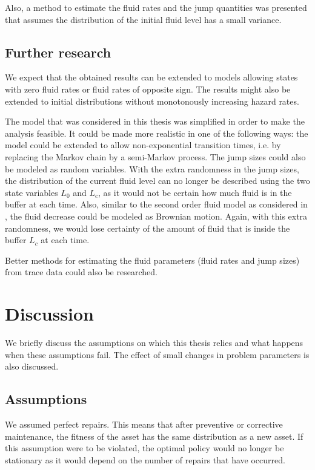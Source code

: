 \documentclass[a4paper]{thesis}
\theoremstyle{definition}
\begin{document}
Also, a method to estimate the fluid rates and the jump quantities was presented that assumes the distribution of the initial fluid level has a small variance.

\section{Further research}
We expect that the obtained results can be extended to models allowing states with zero fluid rates or fluid rates of opposite sign.
The results might also be extended to initial distributions without monotonously increasing hazard rates.

The model that was considered in this thesis was simplified in order to make the analysis feasible.
It could be made more realistic in one of the following ways:
the model could be extended to allow non-exponential transition times, i.e. by replacing the Markov chain by a semi-Markov process.
The jump sizes could also be modeled as random variables.
With the extra randomness in the jump sizes, the distribution of the current fluid level can no longer be described using the two state variables $L_0$ and $L_c$, as it would not be certain how much fluid is in the buffer at each time.
Also, similar to the second order fluid model as considered in \cite{Gribaudo2007}, the fluid decrease could be modeled as Brownian motion.
Again, with this extra randomness, we would lose certainty of the amount of fluid that is inside the buffer $L_c$ at each time.

Better methods for estimating the fluid parameters (fluid rates and jump sizes) from trace data could also be researched.

\chapter{Discussion}\label{chapter:discussion}
We briefly discuss the assumptions on which this thesis relies and what happens when these assumptions fail.
The effect of small changes in problem parameters is also discussed.
\section{Assumptions}
We assumed perfect repairs.
This means that after preventive or corrective maintenance, the fitness of the asset has the same distribution as a new asset.
If this assumption were to be violated, the optimal policy would no longer be stationary as it would depend on the number of repairs that have occurred.
\end{document}
